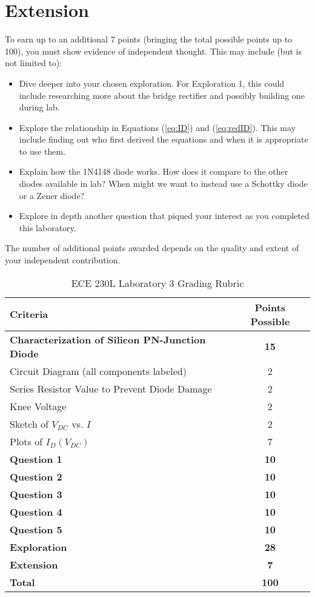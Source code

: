\documentclass[12pt]{../manual}
\begin{document}
\section{Extension}
To earn up to an additional 7 points (bringing the total possible points up to 100), you must show evidence of independent thought. This may include (but is not limited to):
\renewcommand\labelitemi{\textbullet}
\begin{itemize}
\item Dive deeper into your chosen exploration. For Exploration 1, this could include researching more about the bridge rectifier and possibly building one during lab.
\item Explore the relationship in Equations (\ref{eq:ID}) and (\ref{eq:redID}). This may include finding out who first derived the equations and when it is appropriate to use them.
\item Explain how the 1N4148 diode works. How does it compare to the other diodes available in lab? When might we want to instead use a Schottky diode or a Zener diode?
\item Explore in depth another question that piqued your interest as you completed this laboratory.
\end{itemize}
The number of additional points awarded depends on the quality and extent of your independent contribution.

\newpage
{}
{}
\hspace{0pt}
\vfill %
\begin{table}[ht!]
\caption{ECE 230L Laboratory 3 Grading Rubric}
\centering
\begin{tabular}{l|c} \hline
Criteria & Points Possible \\ \hline \hline
\textbf{Characterization of Silicon PN-Junction Diode}	& \textbf{15} \\ 
Circuit Diagram (all components labeled) 				& 2 \\ 
Series Resistor Value to Prevent Diode Damage			& 2 \\ 
Knee Voltage											& 2 \\ 
Sketch of $V_{DC}$ vs. $I$								& 2 \\ 
Plots of $I_D(V_{DC})$									& 7 \\ \hline
\textbf{Question 1}										& \textbf{10} \\ \hline
\textbf{Question 2}										& \textbf{10} \\ \hline
\textbf{Question 3}										& \textbf{10} \\ \hline
\textbf{Question 4}										& \textbf{10} \\ \hline
\textbf{Question 5}										& \textbf{10} \\ \hline
\textbf{Exploration}									& \textbf{28} \\ \hline
\textbf{Extension}										& \textbf{7} \\ \hline \hline
\textbf{Total}											& \textbf{100} \\ \hline
\end{tabular}
\end{table}
\vfill %
\end{document}
